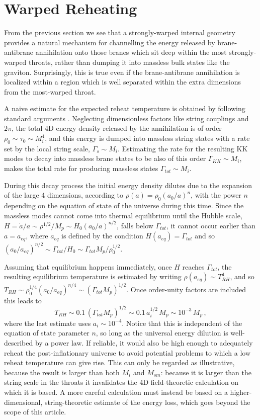 \documentclass[12pt]{JHEP3}
\def\beq{\begin{equation}}
\def\eeq{\end{equation}}
\begin{document}
\section{Warped Reheating}

{}From the previous section we see that a strongly-warped internal
geometry provides a natural mechanism for channelling the energy
released by brane-antibrane annihilation onto those branes which
sit deep within the most strongly-warped throats, rather than
dumping it into massless bulk states like the graviton.
Surprisingly, this is true even if the brane-antibrane
annihilation is localized within a region which is well separated
within the extra dimensions from the most-warped throat.

A naive estimate for the expected reheat temperature is obtained
by following standard arguments \cite{Reheat}. Neglecting
dimensionless factors like string couplings and $2 \pi$, the total
4D energy density released by the annihilation is of order $\rho_0
\sim \tau_0 \sim M_i^4$, and this energy is dumped into massless
string states with a rate set by the local string scale, $\Gamma_s
\sim M_i$. Estimating the rate for the resulting KK modes to decay
into massless brane states to be also of this order $\Gamma_{KK}
\sim M_i$, makes the total rate for producing massless states
$\Gamma_{tot} \sim M_i$.

During this decay process the initial energy density dilutes due
to the expansion of the large 4 dimensions, according to $\rho(a)
= \rho_0 (a_0/a)^n$, with the power $n$ depending on the equation
of state of the universe during this time. Since the massless
modes cannot come into thermal equilibrium until the Hubble scale,
$H = \dot{a}/a \sim \rho^{1/2}/M_p \sim H_0 (a_0/a)^{n/2}$, falls
below $\Gamma_{tot}$, it cannot occur earlier than $a = a_{eq}$,
where $a_{eq}$ is defined by the condition $H(a_{eq}) =
\Gamma_{tot}$ and so $(a_0/a_{eq})^{n/2} \sim \Gamma_{tot}/H_0
\sim \Gamma_{tot} M_p/\rho_0^{1/2}$.

Assuming that equilibrium happens immediately, once $H$ reaches
$\Gamma_{tot}$, the resulting equilibrium temperature is estimated
by writing $\rho(a_{eq}) \sim T_{RH}^4$, and so $T_{RH} \sim
\rho_0^{1/4} ( a_0/a_{eq})^{n/4} \sim (\Gamma_{tot} M_p)^{1/2}$.
Once order-unity factors are included this leads to
%
\beq
\label{reheat}
    T_{RH} \sim 0.1 \, (\Gamma_{tot} M_p)^{1/2} \sim 0.1 \,
    a_i^{1/2} \, M_p \sim 10^{-3} \, M_p \,,
\eeq
%
where the last estimate uses $a_i \sim 10^{-4}$. Notice that this is
independent of the equation of state parameter $n$, so long as the
universal energy dilution is well-described by a power law. If reliable,
it would also be high enough to adequately reheat the post-inflationary
universe to avoid potential problems to which a low reheat temperature
can give rise.  This can only be regarded as illustrative, because the
result is larger than both $M_i$ and $M_{sm}$: because it is larger than
the string scale in the throats it invalidates the 4D field-theoretic
calculation on which it is based. A more careful calculation must instead
be based on a higher-dimensional, string-theoretic estimate of the energy
loss, which goes beyond the scope of this article.
\end{document}
